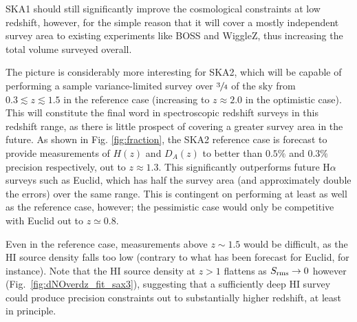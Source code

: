 \documentclass[useAMS,usenatbib]{mn2e}
\newcommand{\corr}{\color{blue}} %
\begin{document}
SKA1 should still significantly improve the cosmological constraints at low redshift, however, for the simple reason that it will cover a mostly independent survey area to existing experiments like BOSS and WiggleZ, thus increasing the total volume surveyed overall.

The picture is considerably more interesting for SKA2, which will be capable of performing a sample variance-limited survey over $\sfrac{3}{4}$ of the sky from $0.3 \lesssim z \lesssim 1.5$ in the reference case (increasing to $z \approx 2.0$ in the optimistic case). This will constitute the final word in spectroscopic redshift surveys in this redshift range, as there is little prospect of covering a greater survey area in the future. As shown in Fig. \ref{fig:fraction}, the SKA2 reference case is forecast to provide measurements of $H(z)$ and $D_A(z)$ to better than $0.5\%$ and $0.3\%$ precision respectively, out to $z \approx 1.3$. This significantly outperforms future H$\alpha$ surveys such as Euclid, which has half the survey area (and approximately double the errors) over the same range. This is contingent on performing at least as well as the reference case, however; the pessimistic case would only be competitive with Euclid out to $z \simeq 0.8$.

Even in the reference case, measurements above $z\sim 1.5$ would be difficult, as the HI source density falls too low (contrary to what has been forecast for Euclid, for instance). Note that the HI source density at $z > 1$ flattens as $S_{\rm rms} \to 0$ however (Fig.~\ref{fig:dNOverdz_fit_sax3}), suggesting that a sufficiently deep HI survey could produce precision constraints out to substantially higher redshift, at least in principle.

\end{document}
